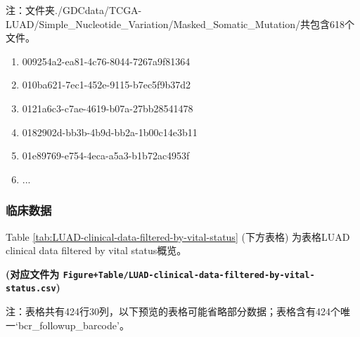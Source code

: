 \documentclass[
]{article}
\providecommand{\tightlist}{%
  \setlength{\itemsep}{0pt}\setlength{\parskip}{0pt}}
\begin{document}
\begin{center}\begin{tcolorbox}[colback=gray!10, colframe=gray!50, width=0.9\linewidth, arc=1mm, boxrule=0.5pt]注：文件夹./GDCdata/TCGA-LUAD/Simple\_Nucleotide\_Variation/Masked\_Somatic\_Mutation/共包含618个文件。

\begin{enumerate}\tightlist
\item 009254a2-ea81-4c76-8044-7267a9f81364
\item 010ba621-7ec1-452e-9115-b7ec5f9b37d2
\item 0121a6c3-c7ae-4619-b07a-27bb28541478
\item 0182902d-bb3b-4b9d-bb2a-1b00c14e3b11
\item 01e89769-e754-4eca-a5a3-b1b72ac4953f
\item ...
\end{enumerate}\end{tcolorbox}
\end{center}

\hypertarget{ux4e34ux5e8aux6570ux636e}{%
\subsubsection{临床数据}\label{ux4e34ux5e8aux6570ux636e}}

Table \ref{tab:LUAD-clinical-data-filtered-by-vital-status} (下方表格) 为表格LUAD clinical data filtered by vital status概览。

\textbf{(对应文件为 \texttt{Figure+Table/LUAD-clinical-data-filtered-by-vital-status.csv})}

\begin{center}\begin{tcolorbox}[colback=gray!10, colframe=gray!50, width=0.9\linewidth, arc=1mm, boxrule=0.5pt]注：表格共有424行30列，以下预览的表格可能省略部分数据；表格含有424个唯一`bcr\_followup\_barcode'。
\end{tcolorbox}
\end{center}
\end{document}
